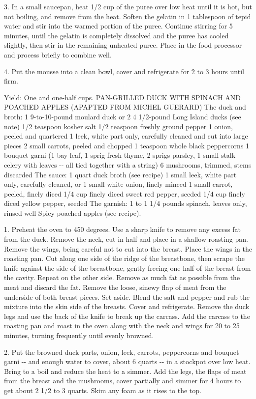 3. In a small saucepan, heat 1/2 cup of the puree over low heat until it
is hot, but not boiling, and remove from the heat. Soften the gelatin in
1 tablespoon of tepid water and stir into the warmed portion of the
puree. Continue stirring for 5 minutes, until the gelatin is completely
dissolved and the puree has cooled slightly, then stir in the remaining
unheated puree. Place in the food processor and process briefly to
combine well.

4. Put the mousse into a clean bowl, cover and refrigerate for 2 to 3
hours until firm.

Yield: One and one-half cups. PAN-GRILLED DUCK WITH SPINACH AND POACHED
APPLES (APAPTED FROM MICHEL GUERARD) The duck and broth: 1 9-to-10-pound
moulard duck or 2 4 1/2-pound Long Island ducks (see note) 1/2 teaspoon
kosher salt 1/2 teaspoon freshly ground pepper 1 onion, peeled and
quartered 1 leek, white part only, carefully cleaned and cut into large
pieces 2 small carrots, peeled and chopped 1 teaspoon whole black
peppercorns 1 bouquet garni (1 bay leaf, 1 sprig fresh thyme, 2 sprigs
parsley, 1 small stalk celery with leaves -\/- all tied together with a
string) 6 mushrooms, trimmed, stems discarded The sauce: 1 quart duck
broth (see recipe) 1 small leek, white part only, carefully cleaned, or
1 small white onion, finely minced 1 small carrot, peeled, finely diced
1/4 cup finely diced sweet red pepper, seeded 1/4 cup finely diced
yellow pepper, seeded The garnish: 1 to 1 1/4 pounds spinach, leaves
only, rinsed well Spicy poached apples (see recipe).

1. Preheat the oven to 450 degrees. Use a sharp knife to remove any
excess fat from the duck. Remove the neck, cut in half and place in a
shallow roasting pan. Remove the wings, being careful not to cut into
the breast. Place the wings in the roasting pan. Cut along one side of
the ridge of the breastbone, then scrape the knife against the side of
the breastbone, gently freeing one half of the breast from the cavity.
Repeat on the other side. Remove as much fat as possible from the meat
and discard the fat. Remove the loose, sinewy flap of meat from the
underside of both breast pieces. Set aside. Blend the salt and pepper
and rub the mixture into the skin side of the breasts. Cover and
refrigerate. Remove the duck legs and use the back of the knife to break
up the carcass. Add the carcass to the roasting pan and roast in the
oven along with the neck and wings for 20 to 25 minutes, turning
frequently until evenly browned.

2. Put the browned duck parts, onion, leek, carrots, peppercorns and
bouquet garni -\/- and enough water to cover, about 6 quarts -\/- in a
stockpot over low heat. Bring to a boil and reduce the heat to a simmer.
Add the legs, the flaps of meat from the breast and the mushrooms, cover
partially and simmer for 4 hours to get about 2 1/2 to 3 quarts. Skim
any foam as it rises to the top.

